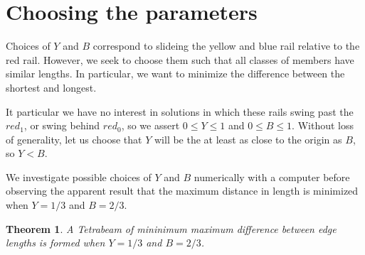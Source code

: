 \documentclass[11pt]{article}
\newtheorem{theorem}{Theorem}
\begin{document}
 \section{Choosing the parameters}

 Choices of $Y$ and $B$ correspond to slideing the yellow and blue rail relative to the red rail. However, we seek to choose them such that all
 classes of members have similar lengths. In particular, we want to minimize the difference between the shortest and longest.

 It particular we have no interest in solutions in which these rails swing past the $red_1$, or swing behind $red_0$, so we
 assert $0 \leq Y \leq 1$ and $0 \leq B \leq 1$. Without loss of generality, let us choose that $Y$ will be the at least as close to the origin as $B$,
 so $Y  < B$.

 We investigate possible choices of $Y$ and $B$ numerically with a computer before observing the apparent result that the maximum distance in
 length is minimized when $Y = 1/3$ and $B = 2/3$.

 \begin{theorem}
A Tetrabeam of mininimum maximum difference between edge lengths is formed when $Y = 1/3$ and $B = 2/3$.
\end{theorem}
\end{document}
